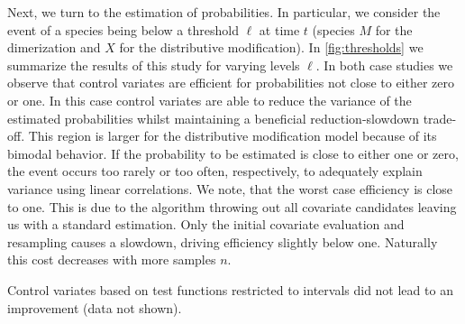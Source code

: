 Next, we turn to the estimation of probabilities.
In particular, we consider the event of a species being below a threshold $\ell$ at time $t$ (species $M$ for the dimerization and $X$ for the distributive modification).
In \autoref{fig:thresholds} we summarize the results of this study for varying levels $\ell$.
In both case studies we observe that control variates are efficient for probabilities not close to either zero or one.
In this case control variates are able to reduce the variance of the estimated probabilities whilst maintaining a beneficial reduction-slowdown trade-off.
This region is larger for the distributive modification model because of its bimodal behavior.
If the probability to be estimated is close to either one or zero, the event occurs too rarely or too often, respectively, to adequately explain variance using linear correlations.
We note, that the worst case efficiency is close to one.
This is due to the algorithm throwing out all covariate candidates leaving us with a standard estimation.
Only the initial covariate evaluation and resampling causes a slowdown, driving efficiency slightly below one.
Naturally this cost decreases with more samples $n$.

Control variates based on test functions restricted to intervals did not lead to an improvement (data not shown).

